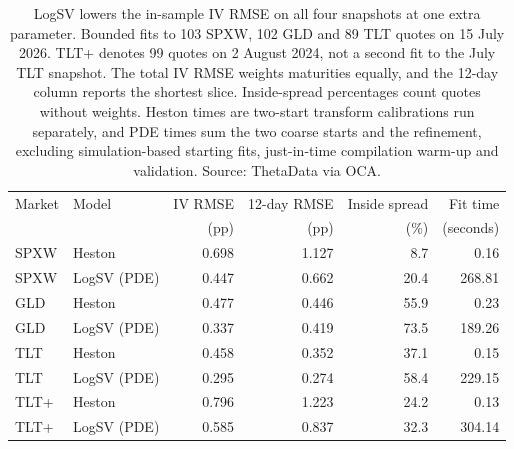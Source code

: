 \documentclass[11pt,a4paper]{article}
\theoremstyle{definition}
\theoremstyle{remark}
\begin{document}
\begin{table}[htbp]\centering\small
\begin{tabular}{@{}l l r r r r@{}}\toprule
Market & Model & IV RMSE & 12-day RMSE & Inside spread & Fit time\\
 & & (pp) & (pp) & (\%) & (seconds)\\\midrule

SPXW & Heston & 0.698 & 1.127 & 8.7 & 0.16 \\

SPXW & LogSV (PDE) & 0.447 & 0.662 & 20.4 & 268.81 \\

GLD & Heston & 0.477 & 0.446 & 55.9 & 0.23 \\

GLD & LogSV (PDE) & 0.337 & 0.419 & 73.5 & 189.26 \\

TLT & Heston & 0.458 & 0.352 & 37.1 & 0.15 \\

TLT & LogSV (PDE) & 0.295 & 0.274 & 58.4 & 229.15 \\

TLT+ & Heston & 0.796 & 1.223 & 24.2 & 0.13 \\

TLT+ & LogSV (PDE) & 0.585 & 0.837 & 32.3 & 304.14 \\

\bottomrule\end{tabular}
\caption{LogSV lowers the in-sample IV RMSE on all four snapshots at one extra
parameter. Bounded fits to 103 SPXW, 102 GLD and 89 TLT quotes on 15 July 2026.
TLT+ denotes 99 quotes on 2 August 2024, not a second fit to the July TLT snapshot.
The total IV RMSE weights maturities equally, and the 12-day column reports the
shortest slice. Inside-spread percentages count quotes without weights. Heston
times are two-start transform calibrations run separately, and PDE times sum the two coarse
starts and the refinement, excluding simulation-based starting fits, just-in-time compilation warm-up
and validation. Source: ThetaData
via OCA.}
\label{tab:oca-fits}\end{table}
\end{document}
